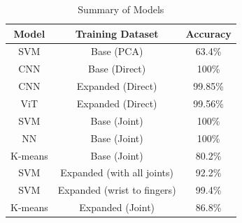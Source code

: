 \documentclass{article}
\begin{document}
\begin{table}[h]
\vskip -0.1in
\caption{Summary of Models}
\label{tab:nonjoint}
\centering
\small
\begin{tabular}{c | c | c}
\toprule
Model & Training Dataset & Accuracy \\
\midrule
SVM & Base (PCA) & 63.4\% \\
\midrule
CNN & Base (Direct) & 100\% \\
\midrule
CNN & Expanded (Direct) & 99.85\% \\
\midrule
ViT & Expanded (Direct) & 99.56\% \\
\midrule
SVM & Base (Joint) & 100\% \\
\midrule
NN & Base (Joint) & 100\% \\
\midrule
K-means & Base (Joint) & 80.2\% \\
\midrule
SVM & Expanded (with all joints) & 92.2\% \\
\midrule
SVM & Expanded (wrist to fingers) & 99.4\% \\
\midrule
K-means & Expanded (Joint) & 86.8\% \\
\bottomrule
\end{tabular}
\end{table}
\end{document}

